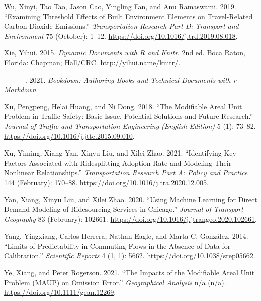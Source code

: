 \documentclass[
  11pt,
  openany]{memoir}
\newlength{\cslhangindent}
\newlength{\cslentryspacingunit} %
\newenvironment{CSLReferences}[2] %
 {%
  \setlength{\parindent}{0pt}
  \ifodd #1
  \let\oldpar\par
  \def\par{\hangindent=\cslhangindent\oldpar}
  \fi
  \setlength{\parskip}{#2\cslentryspacingunit}
 }%
 {}
\begin{document}
\begin{CSLReferences}{1}{0}
\leavevmode{}%
Wu, Xinyi, Tao Tao, Jason Cao, Yingling Fan, and Anu Ramaswami. 2019. {``Examining Threshold Effects of Built Environment Elements on Travel-Related Carbon-Dioxide Emissions.''} \emph{Transportation Research Part D: Transport and Environment} 75 (October): 1--12. \url{https://doi.org/10.1016/j.trd.2019.08.018}.

\leavevmode{}%
Xie, Yihui. 2015. \emph{Dynamic Documents with {R} and Knitr}. 2nd ed. Boca Raton, Florida: Chapman; Hall/CRC. \url{http://yihui.name/knitr/}.

\leavevmode{}%
---------. 2021. \emph{Bookdown: Authoring Books and Technical Documents with r Markdown}.

\leavevmode{}%
Xu, Pengpeng, Helai Huang, and Ni Dong. 2018. {``The Modifiable Areal Unit Problem in Traffic Safety: Basic Issue, Potential Solutions and Future Research.''} \emph{Journal of Traffic and Transportation Engineering (English Edition)} 5 (1): 73--82. \url{https://doi.org/10.1016/j.jtte.2015.09.010}.

\leavevmode{}%
Xu, Yiming, Xiang Yan, Xinyu Liu, and Xilei Zhao. 2021. {``Identifying Key Factors Associated with Ridesplitting Adoption Rate and Modeling Their Nonlinear Relationships.''} \emph{Transportation Research Part A: Policy and Practice} 144 (February): 170--88. \url{https://doi.org/10.1016/j.tra.2020.12.005}.

\leavevmode{}%
Yan, Xiang, Xinyu Liu, and Xilei Zhao. 2020. {``Using Machine Learning for Direct Demand Modeling of Ridesourcing Services in {Chicago}.''} \emph{Journal of Transport Geography} 83 (February): 102661. \url{https://doi.org/10.1016/j.jtrangeo.2020.102661}.

\leavevmode{}%
Yang, Yingxiang, Carlos Herrera, Nathan Eagle, and Marta C. González. 2014. {``Limits of {Predictability} in {Commuting Flows} in the {Absence} of {Data} for {Calibration}.''} \emph{Scientific Reports} 4 (1, 1): 5662. \url{https://doi.org/10.1038/srep05662}.

\leavevmode{}%
Ye, Xiang, and Peter Rogerson. 2021. {``The {Impacts} of the {Modifiable Areal Unit Problem} ({MAUP}) on {Omission Error}.''} \emph{Geographical Analysis} n/a (n/a). \url{https://doi.org/10.1111/gean.12269}.


\end{CSLReferences}
\end{document}
